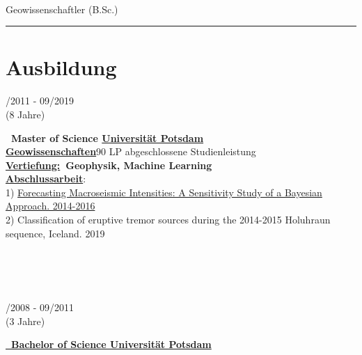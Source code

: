 \documentclass{article}
\newcommand{\minipageSmallEd}{0.19}
\newcommand{\minipageBigEd}{0.78}
\begin{document}
\hfill
\vrule
\hfill
\begin{minipage}[t]{0.70\textwidth}
	\vspace{0pt}
	{\fontsize{30pt}{62pt}\color{gray} }\\
	{\fontsize{14pt}{24pt}\color{pblue} \selectfont Geowissenschaftler \color{lightgray} (B.Sc.)}\\
	\hrule
	\section*{\fontsize{18pt}{24pt}\selectfont \color{pblue} Ausbildung}
	\begin{minipage}[t]{\minipageSmallEd\textwidth}
		/2011 - 09/2019\\(8 Jahre)
	\end{minipage}
	\hfill
	\begin{minipage}[t]{\minipageBigEd\textwidth}
		\textbf{\color{pblue}\faHourglassHalf~Master of Science \hfill
			\href{https://www.uni-potsdam.de/}{\color{pblue}Universität Potsdam}}\\
		\textbf{\underline{Geowissenschaften}}\hfill{90 LP abgeschlossene Studienleistung}\\
		\textbf{\underline{Vertiefung:}~Geophysik, Machine Learning}\\
		\textbf{\underline{Abschlussarbeit}}:\\ 1) \href{https://github.com/silvioschwarz/master-Abschlussarbeit}{Forecasting Macroseismic Intensities: A Sensitivity Study of a Bayesian Approach. 2014-2016} \\
		2) Classification of eruptive tremor sources during the 2014-2015 Holuhraun sequence, Iceland. 2019
	\end{minipage}\\\\\\
	\hfill
	\begin{minipage}[t]{\minipageSmallEd\textwidth}
		/2008 - 09/2011\\(3 Jahre)
	\end{minipage}
	\hfill
	\begin{minipage}[t]{\minipageBigEd\textwidth}
		\textbf{\href{https://www.dropbox.com/s/297g1chiby8mrd3/Bachelor-Certificate.pdf?dl=0}{\color{pblue}\faGraduationCap~Bachelor of Science \hfill	\href{https://www.uni-potsdam.de/}{\color{pblue}Universität Potsdam}}}\\

\end{minipage}
\end{minipage}
\end{document}

